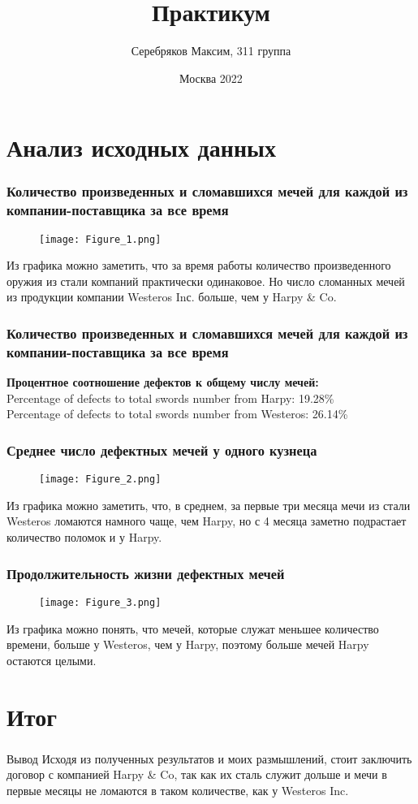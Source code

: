\documentclass[10pt,pdf,hyperref={unicode}]{beamer}
\title{\huge Практикум }
\author{Серебряков Максим, 311 группа}
\date{Москва 2022}
\begin{document}
\frame[plain]{\titlepage}

\section{Анализ исходных данных}

\begin{frame}
\frametitle{Количество произведенных и сломавшихся мечей для каждой из компании-поставщика за все время}
\begin{figure}[t]
    \centering
    \texttt{[image: Figure\_1.png]}
\end{figure}
Из графика можно заметить, что за время работы количество произведенного оружия из стали компаний практически одинаковое. Но число сломанных мечей из продукции компании Westeros Inс. больше, чем у Harpy \& Co.
\end{frame}

\begin{frame}
\frametitle{Количество произведенных и сломавшихся мечей для каждой из компании-поставщика за все время}

\textbf{Процентное соотношение дефектов к общему числу мечей:} \\
Percentage of defects to total swords number from Harpy: 19.28\% \\
Percentage of defects to total swords number from Westeros: 26.14\%
\end{frame}

\begin{frame}
\frametitle{Среднее число дефектных мечей у одного кузнеца}
\begin{figure}[t]
    \centering
    \texttt{[image: Figure\_2.png]}
\end{figure}
Из графика можно заметить, что, в среднем, за первые три месяца мечи из стали Westeros ломаются намного чаще, чем Harpy, но с 4 месяца заметно подрастает количество поломок и у Harpy.
\end{frame}

\begin{frame}
\frametitle{Продолжительность жизни дефектных мечей}
\begin{figure}[t]
    \centering
    \texttt{[image: Figure\_3.png]}
\end{figure}
Из графика можно понять, что мечей, которые служат меньшее количество времени, больше у Westeros, чем у Harpy, поэтому больше мечей Harpy остаются целыми. 
\end{frame}

\section{Итог}

\begin{frame}
\frametitle{\insertsection}
    \begin{block}{Вывод}
    Исходя из полученных результатов и моих размышлений, стоит заключить договор с компанией Harpy & Co, так как их сталь служит дольше и мечи в первые месяцы не ломаются в таком количестве, как у Westeros Inc. 
    \end{block}
\end{frame}
\end{document}
